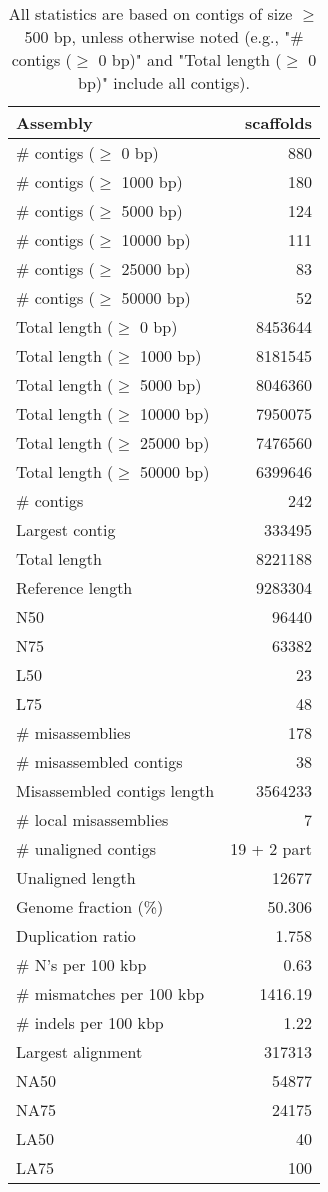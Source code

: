 \documentclass[12pt,a4paper]{article}
\begin{document}
\begin{table}[ht]
\begin{center}
\caption{All statistics are based on contigs of size $\geq$ 500 bp, unless otherwise noted (e.g., "\# contigs ($\geq$ 0 bp)" and "Total length ($\geq$ 0 bp)" include all contigs).}
\begin{tabular}{|l*{1}{|r}|}
\hline
Assembly & scaffolds \\ \hline
\# contigs ($\geq$ 0 bp) & 880 \\ \hline
\# contigs ($\geq$ 1000 bp) & 180 \\ \hline
\# contigs ($\geq$ 5000 bp) & 124 \\ \hline
\# contigs ($\geq$ 10000 bp) & 111 \\ \hline
\# contigs ($\geq$ 25000 bp) & 83 \\ \hline
\# contigs ($\geq$ 50000 bp) & 52 \\ \hline
Total length ($\geq$ 0 bp) & 8453644 \\ \hline
Total length ($\geq$ 1000 bp) & 8181545 \\ \hline
Total length ($\geq$ 5000 bp) & 8046360 \\ \hline
Total length ($\geq$ 10000 bp) & 7950075 \\ \hline
Total length ($\geq$ 25000 bp) & 7476560 \\ \hline
Total length ($\geq$ 50000 bp) & 6399646 \\ \hline
\# contigs & 242 \\ \hline
Largest contig & 333495 \\ \hline
Total length & 8221188 \\ \hline
Reference length & 9283304 \\ \hline
N50 & 96440 \\ \hline
N75 & 63382 \\ \hline
L50 & 23 \\ \hline
L75 & 48 \\ \hline
\# misassemblies & 178 \\ \hline
\# misassembled contigs & 38 \\ \hline
Misassembled contigs length & 3564233 \\ \hline
\# local misassemblies & 7 \\ \hline
\# unaligned contigs & 19 + 2 part \\ \hline
Unaligned length & 12677 \\ \hline
Genome fraction (\%) & 50.306 \\ \hline
Duplication ratio & 1.758 \\ \hline
\# N's per 100 kbp & 0.63 \\ \hline
\# mismatches per 100 kbp & 1416.19 \\ \hline
\# indels per 100 kbp & 1.22 \\ \hline
Largest alignment & 317313 \\ \hline
NA50 & 54877 \\ \hline
NA75 & 24175 \\ \hline
LA50 & 40 \\ \hline
LA75 & 100 \\ \hline
\end{tabular}
\end{center}
\end{table}
\end{document}
